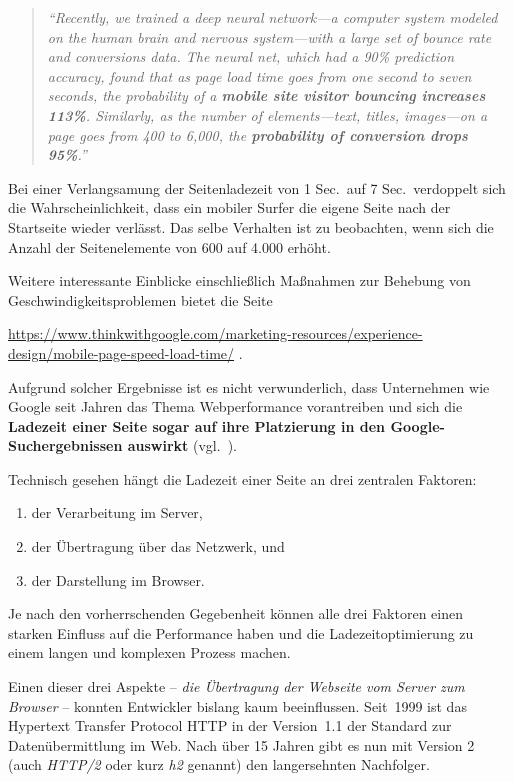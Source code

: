 \documentclass[a4paper, justified, notoc]{tufte-handout} %
\begin{document}
\begin{quote}
	\emph{``Recently, we trained a deep neural network---a computer system modeled on the human brain and nervous system---with a large set of bounce rate and conversions data. The neural net, which had a 90\% prediction accuracy, found that as page load time goes from one second to seven seconds, the probability of a \textbf{mobile site visitor bouncing increases 113\%}. Similarly, as the number of elements---text, titles, images---on a page goes from 400 to 6,000, the \textbf{probability of conversion drops 95\%}.''}
\end{quote}

Bei einer Verlangsamung der Seitenladezeit von 1 Sec.\ auf 7 Sec.\ verdoppelt sich die Wahrscheinlichkeit, dass ein mobiler Surfer die eigene Seite nach der Startseite wieder verlässt. Das selbe Verhalten ist zu beobachten, wenn sich die Anzahl der Seitenelemente von 600 auf 4.000 erhöht. 

Weitere interessante Einblicke einschließlich Maßnahmen zur Behebung von Geschwindigkeitsproblemen bietet die Seite

\url{https://www.thinkwithgoogle.com/marketing-resources/experience-design/mobile-page-speed-load-time/} .

Aufgrund solcher Ergebnisse ist es nicht verwunderlich, dass Unternehmen wie Google seit Jahren das Thema Webperformance vorantreiben und sich die \textbf{Ladezeit einer Seite sogar auf ihre Platzierung in den Google-Suchergebnissen auswirkt} (vgl.~\cite{schwartz:2018}).

Technisch gesehen hängt die Ladezeit einer Seite an drei zentralen Faktoren: 
\begin{enumerate}
	\item der Verarbeitung im Server, 
	\item der Übertragung über das Netzwerk, und 
	\item der Darstellung im Browser.
\end{enumerate} 
Je nach den vorherrschenden Gegebenheit können alle drei Faktoren einen starken Einfluss auf die Performance haben und die Ladezeitoptimierung zu einem langen und komplexen Prozess machen.

Einen dieser drei Aspekte -- \emph{die Übertragung der Webseite vom Server zum Browser} -- konnten Entwickler bislang kaum beeinflussen. Seit~1999 ist das Hypertext Transfer Protocol HTTP in der Version~1.1 der Standard zur Datenübermittlung im Web. Nach über 15 Jahren gibt es nun mit Version 2 (auch \emph{HTTP/2} oder kurz \emph{h2} genannt) den langersehnten Nachfolger. 
\end{document}
